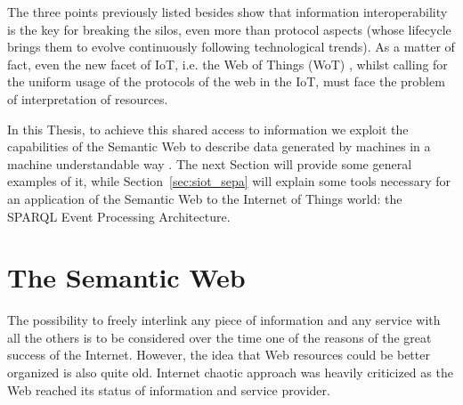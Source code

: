 The three points previously listed besides show that information interoperability is the key for breaking the silos, even more than protocol aspects (whose lifecycle brings them to evolve continuously following technological trends). As a matter of fact, even the new facet of IoT, i.e. the Web of Things (WoT) \cite{guinard2011internet, raggett2015web}, whilst calling for the uniform usage of the protocols of the web in the IoT, must face the problem of interpretation of resources.

In this Thesis, to achieve this shared access to information we exploit the capabilities of the Semantic Web  to describe data generated by machines in a machine understandable way \cite{berners2001semantic, shadbolt2006semantic}. The next Section will provide some general examples of it, while Section~\ref{sec:siot_sepa} will explain some tools necessary for an application of the Semantic Web to the Internet of Things world: the SPARQL Event Processing Architecture.



\section{The Semantic Web}
\label{sec:semantic_web}

The possibility to freely interlink any piece of information and any service with all the others is to be considered over the time one of the reasons of the great success of the Internet. However, the idea that Web resources could be better organized is also quite old. Internet chaotic approach was heavily criticized as the Web reached its status of information and service provider. 


